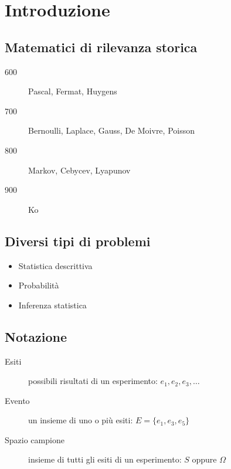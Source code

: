 \documentclass{subfiles}
\begin{document}
\section{Introduzione}

\subsection{Matematici di rilevanza storica}

\begin{description}
	\item[600] Pascal, Fermat, Huygens
	\item[700] Bernoulli, Laplace, Gauss, De Moivre, Poisson
	\item[800] Markov, Cebycev, Lyapunov
	\item[900] Ko
\end{description}

\subsection{Diversi tipi di problemi}

\begin{itemize}
    \item Statistica descrittiva
    \item Probabilità
    \item Inferenza statistica
\end{itemize}

\subsection{Notazione}

\begin{description}
	\item[Esiti] possibili risultati di un esperimento: $e_1, e_2, e_3, \dots$
	\item[Evento] un insieme di uno o più esiti: $E = \{ e_1, e_3, e_5 \}$
	\item[Spazio campione] insieme di tutti gli esiti di un esperimento: $S \text{ oppure } \Omega$
\end{description}
\end{document}
